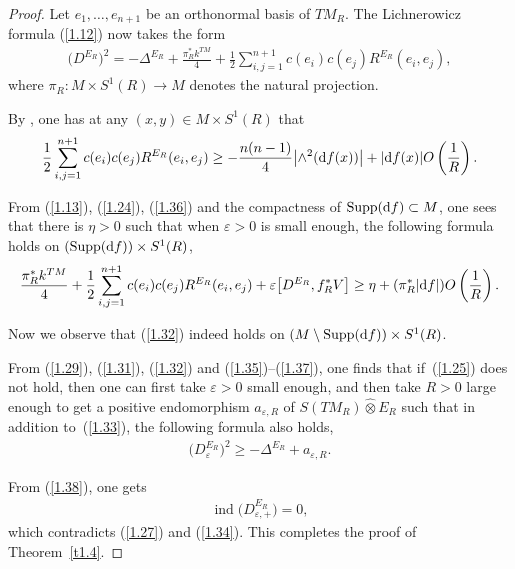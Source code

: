 \documentclass[pdftex]{sigma}
\numberwithin{equation}{section}
\theoremstyle{definition}
\begin{document}
\begin{proof}
Let $e_1, \dots, e_{n+1}$ be an orthonormal basis of $TM_R$. The Lichnerowicz formula (\ref{1.12}) now takes the form
\begin{gather}\label{1.35}
\big(D^{E_R}\big)^2=-\Delta^{E_R}+\frac{\pi_R^*k^{TM}}{4}+\frac{1}{2}\sum_{i, j=1}^{n+1}
c (e_i )c (e_j )R^{E_R} (e_i,e_j ) ,
\end{gather}
where $\pi_R\colon M\times S^1(R)\rightarrow M$ denotes the natural projection.

By \cite[p.~68]{L98}, one has at any $(x,y)\in M\times S^1(R)$ that
\begin{gather}\label{1.36}
 \frac{1}{2}\sum_{i, j=1}^{n+1}
c (e_i )c (e_j )R^{E_R} (e_i,e_j ) \geq -\frac{n(n-1)}{4}\big|{\wedge}^2({\rm d}f(x))\big| + |{\rm d}f(x)| O\left(\frac{1}{R}\right).
\end{gather}

From (\ref{1.13}), (\ref{1.24}), (\ref{1.36}) and the compactness of $\operatorname{Supp}({\rm d}f)\subset M$, one sees that there is $\eta>0$ such that when $\varepsilon>0$ is small enough, the following formula holds on $(\operatorname{Supp}({\rm d}f))\times S^1(R)$,
\begin{gather}\label{1.37}
 \frac{\pi_R^*k^{TM}}{4}+\frac{1}{2}\sum_{i, j=1}^{n+1}
c(e_i)c(e_j)R^{E_R}(e_i,e_j) + \varepsilon \big[D^{E_R},f_R^*V\big]
\geq \eta+ (\pi_R^* |{\rm d}f| )O\left(\frac{1}{R}\right).
\end{gather}

Now we observe that (\ref{1.32}) indeed holds on $(M\setminus \operatorname{Supp}({\rm d}f))\times S^1(R)$.

From (\ref{1.29}), (\ref{1.31}), (\ref{1.32}) and (\ref{1.35})--(\ref{1.37}), one finds that if~(\ref{1.25}) does not hold, then one can first take $\varepsilon>0$ small enough, and then take $R>0$ large enough to get a positive endomorphism $a_{\varepsilon,R}$ of $S(TM_R)\widehat\otimes E_R$ such that in addition to~(\ref{1.33}), the following formula also holds,
 \begin{gather}\label{1.38}
\big(D_\varepsilon^{E_R}\big)^2 \geq -\Delta^{E_R} +a_{\varepsilon,R}.
\end{gather}

From (\ref{1.38}), one gets
\begin{gather*}%
\operatorname{ind}\big(D^{E_R}_{\varepsilon,+}\big)=0,
\end{gather*}
which contradicts (\ref{1.27}) and (\ref{1.34}). This completes the proof of Theorem~\ref{t1.4}.
\end{proof}
\end{document}
